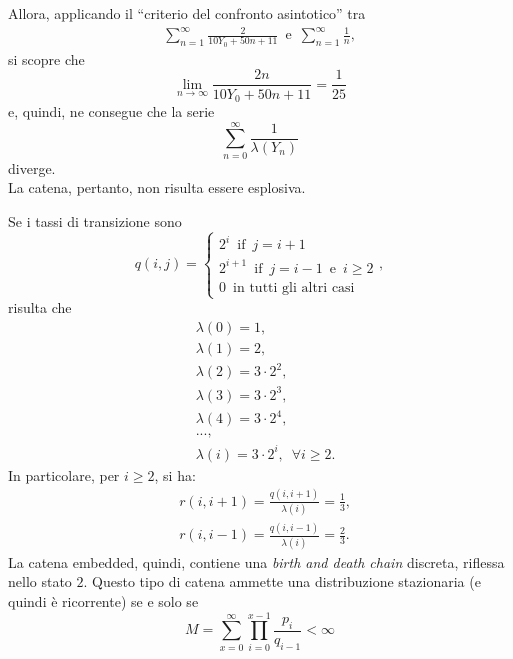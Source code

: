 \documentclass[12pt]{homework}
\begin{document}
\begin{alphaparts}
Allora, applicando il ``criterio del confronto asintotico'' tra
\begin{align*}
\sum_{n=1}^{\infty}\frac{2}{10Y_{0}+50n+11}
\,\,\, \text{e} \,\,\, \sum_{n=1}^{\infty}\frac{1}{n},
\end{align*}
si scopre che
\begin{equation*}
\lim\limits_{n\rightarrow \infty}\frac{2n}{10Y_{0}+50n+11}=\frac{1}{25}
\end{equation*}
  e, quindi, ne consegue che la serie 
\begin{equation*}
 \sum_{n=0}^{\infty}\frac{1}{\lambda\left(Y_{n}\right)}
\end{equation*}  
  diverge.\\
 La catena, pertanto, non risulta essere esplosiva.
  
  \questionpart
  Se i tassi di transizione sono
  \begin{equation*}
  q\left(i,j\right)=\begin{cases}2^{i} \,\,\,\text{if}\,\,\,j=i+1\\2^{i+1} \,\,\,\text{if}\,\,\,j=i-1\,\,\,\text{e}\,\,\,i\geq 2\\0 \,\,\, \text{in tutti gli altri casi}\end{cases},
  \end{equation*}
  risulta che
  \begin{align*}
&\lambda\left(0\right)= 1,\\
&\lambda\left(1\right)= 2,\\
&\lambda\left(2\right)= 3\cdot 2^{2},\\
&\lambda\left(3\right)=3\cdot 2^{3},\\
&\lambda\left(4\right)=3\cdot 2^{4},\\
&...,\\
&\lambda\left(i\right)=3\cdot2^{i}, \,\,\, \forall i\geq 2.
\end{align*}
In particolare, per $i\geq 2$, si ha:
\begin{align*}
&r\left(i,i+1\right)=\frac{q\left(i,i+1\right)}{\lambda\left(i\right)}=\frac{1}{3},\\
&r\left(i,i-1\right)=\frac{q\left(i,i-1\right)}{\lambda\left(i\right)}=\frac{2}{3}.
\end{align*}
La catena embedded, quindi, contiene una \emph{birth and death chain} discreta, riflessa nello stato $2$. Questo tipo di catena ammette una distribuzione stazionaria (e quindi è ricorrente) se e solo se
\begin{equation*}
M=\sum_{x=0}^{\infty}\prod_{i=0}^{x-1}\frac{p_{i}}{q_{i-1}}<\infty

\end{equation*}
\end{alphaparts}
\end{document}

